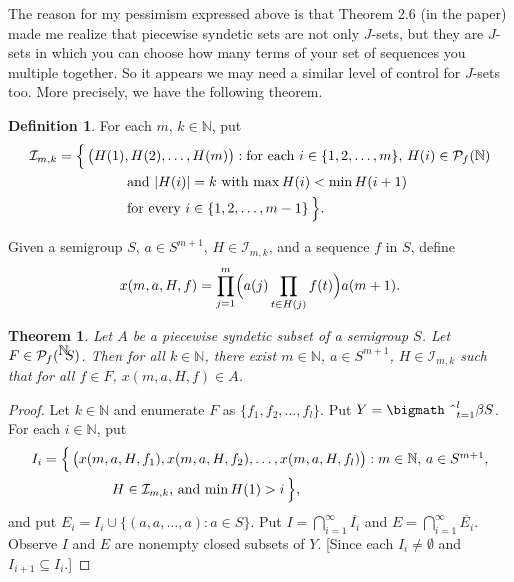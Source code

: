 \documentclass[12pt]{letter}
\theoremstyle{plain}
\newtheorem*{thm}{Theorem}
\theoremstyle{definition}
\newtheorem*{defn}{Definition}
\newcommand{\bbN}{\mathbb{N}}
\newcommand{\calI}{\mathcal{I}}
\newcommand{\Pf}{\mathcal{P}_f}
\newcommand{\setfunc}[2]{\hbox{${}^{\hbox{$#1$}}\hskip -3 pt #2$}}
\newcommand{\bigtimes}{\hbox{\bigmath \char'2}}
\begin{document}
\begin{letter}{}
The reason for my pessimism expressed above is that Theorem 2.6 (in
the paper) made me realize that piecewise syndetic sets are not only
$J$-sets, but they are $J$-sets in which you can choose how many terms of
your set of sequences you multiple together.
So it appears we may need a similar level of control for $J$-sets too.
More precisely, we have the following theorem.

\begin{defn}
  For each $m$, $k \in \bbN$, put
  \begin{align*}
    \calI_{m,k} &= \Bigl\{\, \bigl(H(1), H(2), \ldots, H(m)\bigr) :
    \mbox{for each $i \in \{1, 2, \ldots, m\}$, $H(i) \in \Pf(\bbN)$}
    \\
    &\hspace{5em}\mbox{and $|H(i)| = k$ with $\max H(i) < \min
      H(i+1)$}\\
    &\hspace{5em}\mbox{for every $i \in \{1, 2, \ldots, m-1\}$} \,\Bigr\}.
  \end{align*}

  Given a semigroup $S$, $a \in S^{m+1}$, $H \in \calI_{m,k}$, and a
  sequence $f$ in $S$, define
  \[
    x(m, a, H, f) = \prod_{j=1}^m\Bigl( a(j)\prod_{t \in H(j)} f(t)
    \Bigr) a(m+1).
  \]
\end{defn}

\begin{thm}
  Let $A$ be a piecewise syndetic subset of a semigroup $S$. 
  Let $F \in \Pf(\setfunc{\bbN}{S})$.
  Then for all $k \in \bbN$, there exist $m \in \bbN$, $a \in
  S^{m+1}$, $H \in \calI_{m,k}$ such that for all $f \in F$, $x(m, a,
  H, f) \in A$.
\end{thm}
\begin{proof}
  Let $k \in \bbN$ and enumerate $F$ as $\{f_1, f_2, \ldots, f_l \}$.
  Put $Y = \bigtimes_{t=1}^l \beta S$.
  For each $i \in \bbN$, put
  \begin{align*}
    I_i &= \Bigl\{\, \bigl( x(m, a, H, f_1), x(m, a, H, f_2), \ldots,
    x(m, a, H, f_l) \bigr) : \mbox{$m \in \bbN$, $a \in S^{m+1}$,} \\
    &\hspace{5em} \mbox{$H \in \calI_{m,k}$, and $\min H(1) > i$}
    \,\Bigr\},
  \end{align*}
  and put $E_i = I_i \cup \{(a, a, \ldots, a) : a \in S\}$.
  Put $I = \bigcap_{i=1}^\infty \overline{I_i}$ and $E =
  \bigcap_{i=1}^\infty \overline{E_i}$.
  Observe $I$ and $E$ are nonempty closed subsets of $Y$.
  [Since each $I_i \ne \emptyset$ and $I_{i+1} \subseteq I_i$.]
  

\end{proof}
\end{letter}
\end{document}
